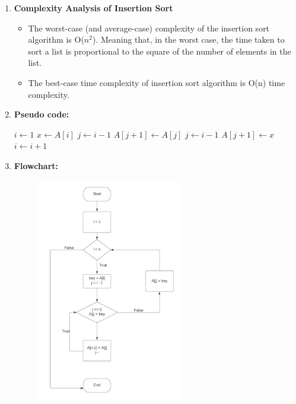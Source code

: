 \documentclass[11pt,a4paper]{article}
\begin{document}
{\begin{enumerate}[label=\textbf{\arabic*})]
				It works similar to the way you sort playing cards in your hands. The array is virtually split into a sorted and an unsorted part. Values from the unsorted part are picked and placed at the correct position in the sorted part.
				\\[12pt]
				\item \textbf{Complexity Analysis of Insertion Sort}
				\begin{itemize}
				\item The worst-case (and average-case) complexity of the insertion sort algorithm is O($n^2$). Meaning that, in the worst case, the time taken to sort a list is proportional to the square of the number of elements in the list.
                \item The best-case time complexity of insertion sort algorithm is O(n) time complexity.
                \end{itemize}
				\item \textbf{Pseudo code:}
				
				\begin{algorithm}
					\begin{algorithmic}[1]
						\State $i \gets 1$
						\State $x \gets A[i]$
						\State $j \gets i - 1$ 
						\State $A[j+1] \gets A[j]$
						\State $j \gets i - 1$ 
						\EndWhile
						\State $A[j+1] \gets x$ 
						\State $i \gets i + 1$ 
						\EndWhile
						\EndProcedure
					\end{algorithmic}
				\end{algorithm}
				\pagebreak
				\item \textbf{Flowchart:}
					\begin{figure}[H]
						\centering 
						\includegraphics[width=0.6\textwidth]{Insertion Sort}
					\end{figure}
					

\end{enumerate}}
\end{document}
